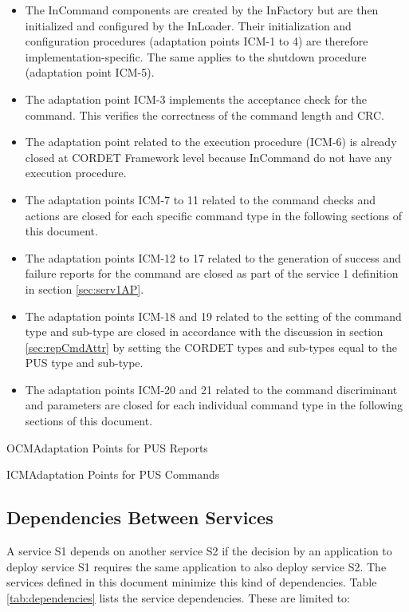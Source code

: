 \documentclass{pnp_article}
\begin{document}
\begin{itemize}
\item The InCommand components are created by the InFactory but are then initialized and configured by the InLoader. Their initialization and configuration procedures (adaptation points ICM-1 to 4) are therefore implementation-specific. The same applies to the shutdown procedure (adaptation point ICM-5).
\item The adaptation point ICM-3 implements the acceptance check for the command. This verifies the correctness of the command length and CRC.
\item The adaptation point related to the execution procedure (ICM-6) is already closed at CORDET Framework level because InCommand do not have any execution procedure.
\item The adaptation points ICM-7 to 11 related to the command checks and actions are closed for each specific command type in the following sections of this document.
\item The adaptation points ICM-12 to 17 related to the generation of success and failure reports for the command are closed as part of the service 1 definition in section \ref{sec:serv1AP}.
\item The adaptation points ICM-18 and 19 related to the setting of the command type and sub-type are closed in accordance with the discussion in section \ref{sec:repCmdAttr} by setting the CORDET types and sub-types equal to the PUS type and sub-type.
\item The adaptation points ICM-20 and 21 related to the command discriminant and parameters are closed for each individual command type in the following sections of this document.
\end{itemize}

\begin{crAp}{OCM}{Adaptation Points for PUS Reports}
\end{crAp}

\newpage
\begin{crAp}{ICM}{Adaptation Points for PUS Commands}
\end{crAp}

\subsection{Dependencies Between Services}\label{sec:dependencies}
A service S1 depends on another service S2 if the decision by an application to deploy service S1 requires the same application to also deploy service S2. The services defined in this document minimize this kind of dependencies. Table \ref{tab:dependencies} lists the service dependencies. These are limited to:
\end{document}
